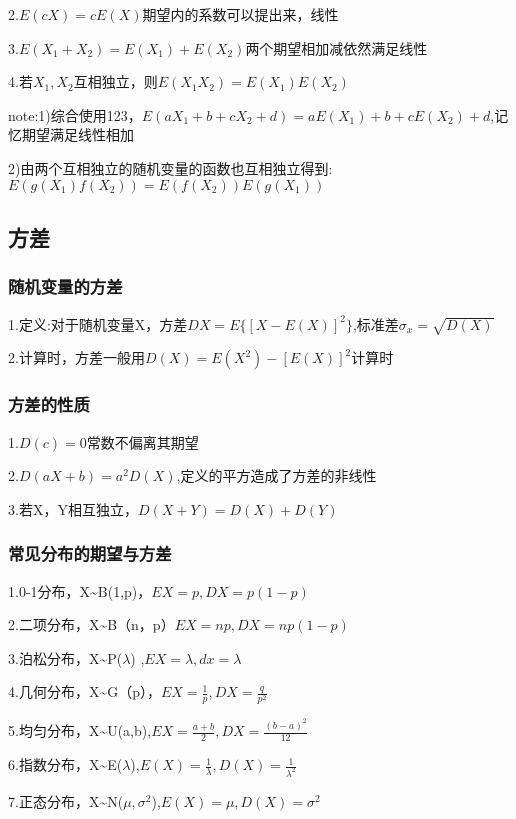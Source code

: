 \documentclass[11pt,twoside,a4paper]{ctexart}
\begin{document}
    2.$E(cX) = cE(X)$期望内的系数可以提出来，线性

    3.$E(X_1 + X_2) = E(X_1) + E(X_2)$两个期望相加减依然满足线性

    4.若$X_1,X_2$互相独立，则$E(X_1X_2) = E(X_1)E(X_2)$

    note:1)综合使用123，$E(aX_1 + b + cX_2 + d) = aE(X_1) + b + cE(X_2) + d$,记忆期望满足线性相加

    2)由两个互相独立的随机变量的函数也互相独立得到:$E(g(X_1)f(X_2))=E(f(X_2))E(g(X_1))$

    \subsection{方差}
    \subsubsection{随机变量的方差}
    1.定义:对于随机变量X，方差$DX = E\{[X - E(X)]^2\}$,标准差$\sigma _x = \sqrt{D(X)}$

    2.计算时，方差一般用$D(X) = E(X^2) - [E(X)]^2$计算时

    \subsubsection{方差的性质}
    1.$D(c) = 0$常数不偏离其期望

    2.$D(aX + b) = a^2D(X)$,定义的平方造成了方差的非线性

    3.若X，Y相互独立，$D(X + Y) = D(X) + D(Y)$

    \subsubsection{常见分布的期望与方差}
    1.0-1分布，X\textasciitilde B(1,p)，$EX = p,DX = p(1-p)$

    2.二项分布，X\textasciitilde B（n，p）$EX = np,DX = np(1-p)$

    3.泊松分布，X\textasciitilde P($\lambda $) ,$EX = \lambda ,dx = \lambda $

    4.几何分布，X\textasciitilde G（p），$EX = \frac{1}{p},DX = \frac{q}{p^2}$

    5.均匀分布，X\textasciitilde U(a,b),$EX = \frac{a+b}{2}, DX = \frac{(b-a)^2}{12}$

    6.指数分布，X\textasciitilde E($\lambda $),$E(X) = \frac{1}{\lambda},D(X) = \frac{1}{\lambda ^2}$

    7.正态分布，X\textasciitilde N($\mu , \sigma ^2$),$E(X) = \mu , D(X) = \sigma ^2$
\end{document}
